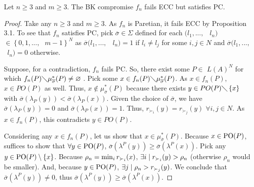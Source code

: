 \documentclass[version=3.21, pagesize, twoside=off, bibliography=totoc, DIV=calc, fontsize=12pt, a4paper]{scrartcl}
\begin{document}
\begin{theorem}
	\label{th:FBn3}
Let $n\geq 3$ and $m\geq 3.$ The BK compromise $f_{n}$ fails ECC but satisfies PC.
\end{theorem}

\begin{proof}
Take any $n\geq 3$ and $m\geq 3.$ As $f_{n}$ is Paretian, it fails ECC by
Proposition 3.1. To see that $f_{n}$ satisfies PC, pick $\overline{\sigma }%
\in \Sigma $ defined for each $(l_{1},...,$ \ $l_{n})$ $\in \left\{ 0,1,...,%
\text{ }m-1\right\} ^{N}$ as $\overline{\sigma }(l_{1},...,$ \ $l_{n})=1$ if 
$l_{i}\neq l_{j}$ for some $i,j\in N$ and $\overline{\sigma }(l_{1},...,$ \ $%
l_{n})=0$ otherwise. 

Suppose, for a contradiction, $f_{n}$ fails PC. So,
there exist some $P\in $ $L(A)^{N}$ for which $f_{n}(P)\diagdown \mu _{%
\overline{\sigma }}^{\ast }(P)\neq \varnothing $ . Pick some $x\in
f_{n}(P)\diagdown \mu _{\overline{\sigma }}^{\ast }(P)$. As $x\in f_{n}(P)$, 
$x\in PO(P)$ as well. Thus, $x\notin \mu _{\overline{\sigma }}^{\ast }(P)$
because there exists $y\in PO(P)\diagdown \left\{ x\right\} $ with  $%
\overline{\sigma }(\lambda _{P}(y))<\overline{\sigma }(\lambda _{P}(x))$.
Given the choice of $\overline{\sigma }$, we have  $\overline{\sigma }%
(\lambda _{P}(y))=0$ and $\overline{\sigma }(\lambda _{P}(x))=1$. Thus, $%
r_{\succ _{i}}(y)=r_{\succ _{j}}(y)$ $\forall i,j\in N$. As $x\in f_{n}(P)$,
this contradicts $y\in PO(P)$.


Considering any $x \in f_n(P)$, let us show that $x \in \mu_{\overline{\sigma}}^*(P)$. Because $x \in \text{PO}(P)$, suffices to show that $\forall y \in \text{PO}(P)$, $\overline{\sigma}(\lambda^P(y)) ≥ \overline{\sigma}(\lambda^P(x))$.
Pick any $y \in \text{PO}(P) \setminus \{x\}$. Because $\rho_n = \min_i r_{\succ_i}(x)$, $\exists i \suchthat r_\prefi(y) > \rho_n$ (otherwise $\rho_n$ would be smaller). And, because $y \in \text{PO}(P)$, $\exists j \suchthat \rho_n > r_{\pref_j}(y)$. We conclude that $\overline{\sigma}(\lambda^P(y)) ≠ 0$, thus $\overline{\sigma}(\lambda^P(y))  ≥ \overline{\sigma}(\lambda^P(x))$.
\end{proof}
\end{document}
